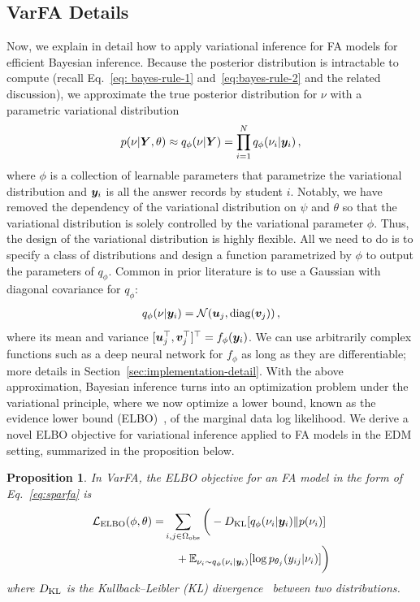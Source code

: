 \documentclass{edm_article}
\newcommand{\ml}[1]{\textcolor{orange}{\bf [LAN bandit: #1]}}
\newtheorem{prop}{Proposition}
\begin{document}
\subsection{VarFA Details}
\label{sec:method-details}
Now, we explain in detail how to apply variational inference for FA models for efficient Bayesian inference.
Because the posterior distribution is intractable to compute (recall Eq.~\ref{eq: bayes-rule-1} and~\ref{eq:bayes-rule-2} and the related discussion), we approximate the true posterior distribution for $\nu$ with a parametric variational distribution
\begin{align}
    p(\nu | {\bm{Y}}, \theta) \approx q_{\phi}(\nu | {\bm{Y}}) = \prod_{i=1}^N q_{\phi}(\nu_i | {\bm{y}}_i)  \,,
\end{align}
where $\phi$ is a collection of learnable parameters that parametrize the variational distribution and ${\bm{y}}_i$ is all the answer records by student $i$. Notably, we have removed the dependency of the variational distribution on $\psi$ and $\theta$ so that the variational distribution is solely controlled by the variational parameter $\phi$. Thus, the design of the variational distribution is highly flexible. All we need to do is to specify a class of distributions and design a function parametrized by $\phi$ to output the parameters of $q_\phi$. 
Common in prior literature is to use a Gaussian with diagonal covariance for $q_\phi$:
\begin{align}
    q_\phi(\nu | {\bm{y}}_i) = \mathcal{N}({\bm{u}}_j, {\rm diag}({\bm{v}}_j))\,,\label{eq:variational-distribution}
\end{align}
where its mean and variance $[{\bm{u}}_j^\top, {\bm{v}}_j^\top]^\top = f_\phi({\bm{y}}_i)$. We can use arbitrarily complex functions such as a deep neural network for $f_\phi$ as long as they are differentiable; more details in Section~\ref{sec:implementation-detail}.
With the above approximation, Bayesian inference turns into an optimization problem under the variational principle, where we now optimize a lower bound, known as the evidence lower bound (ELBO)~\cite{bishop2006pattern}, of the marginal data log likelihood. We derive a novel ELBO objective for variational inference applied to FA models in the EDM setting, summarized in the proposition below.
\begin{prop} In VarFA, the ELBO objective for an FA model in the form of Eq.~\ref{eq:sparfa} is 
\begin{align}
\begin{split}
        \mathcal{L}_{\rm ELBO}(\phi, \theta) =& \sum_{i,j\in\Omega_{\rm obs}} \bigg(-D_{\rm KL}[q_\phi(\nu_i|{\bm{y}}_i)\|p(\nu_i)] \\
    &\quad + \mathbb{E}_{\nu_i\sim q_\phi(\nu_i|{\bm{y}}_i)}[{\rm log}\,p_{\theta_j}(y_{ij}|\nu_i)]\bigg)
\end{split}
\label{eq:elbo}
\end{align}
where $D_{\rm KL}$ is the Kullback–Leibler (KL) divergence~\cite{mackay2003information} between two distributions.
\end{prop}
\end{document}
